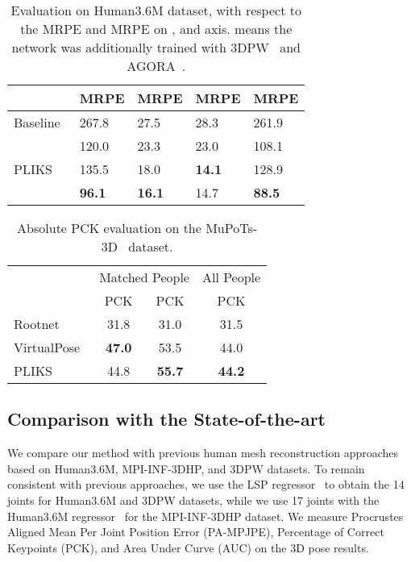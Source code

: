 \documentclass[10pt,twocolumn,letterpaper]{article}
\newcommand{\myrowcolour}{\rowcolor[gray]{0.925}}
\begin{document}
\begin{table}[]
\footnotesize
\centering
\begin{tabular}{lllll}

                             & MRPE           & MRPE       & MRPE       & MRPE        \\ \hline
\multicolumn{1}{l|}{Baseline~\cite{wpc,lcr}} & 267.8          & 27.5          & 28.3          & 261.9          \\\myrowcolour
\multicolumn{1}{l|}{RootNet~\cite{rootnet}}  & 120.0 & 23.3          & 23.0          & 108.1 \\
\multicolumn{1}{l|}{PLIKS}     & 135.5          & 18.0 & \textbf{14.1} & 128.9          \\\myrowcolour
\multicolumn{1}{l|}{PLIKS}     & \textbf{96.1}          & \textbf{16.1} & 14.7 & \textbf{88.5}          \\ \hline

\end{tabular}\caption{\label{tab:root}Evaluation on Human3.6M dataset, with respect to the MRPE and MRPE on ,  and  axis.  means the network was additionally trained with 3DPW~\cite{3dpw} and AGORA~\cite{agora}.}
\end{table}

\begin{table}[]
\centering
\footnotesize
\begin{tabular}{l|cc|c}
      & \multicolumn{2}{c|}{Matched People}       & All People    \\ \cline{2-4} 
      & PCK                     & PCK                      & PCK                           \\ \hline
Rootnet~\cite{rootnet}   & {31.8} & {31.0} & {31.5}       \\\myrowcolour
VirtualPose~\cite{virtualpose}    & \textbf{47.0}            & 53.5                      & 44.0                           \\
PLIKS & 44.8                     & \textbf{55.7}             & \textbf{44.2}                  \\ \hline
\end{tabular}\caption{\label{tab:root2}Absolute PCK evaluation on the MuPoTs-3D~\cite{mupo} dataset.}
\end{table}



\subsection{Comparison with the State-of-the-art}
We compare our method with previous human mesh reconstruction approaches based on Human3.6M, MPI-INF-3DHP, and 3DPW datasets. To remain consistent with previous approaches, we use the LSP regressor~\cite{spin} to obtain the 14 joints for Human3.6M and 3DPW datasets, while we use 17 joints with the Human3.6M regressor~\cite{spin} for the MPI-INF-3DHP dataset. We measure Procrustes Aligned Mean Per Joint Position Error (PA-MPJPE), Percentage of Correct Keypoints (PCK), and Area
Under Curve (AUC) on the 3D pose results.
\end{document}
